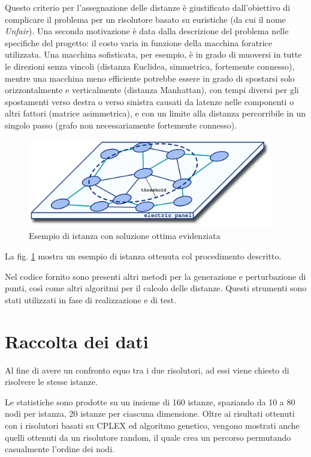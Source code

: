 \documentclass[a4paper, 10pt]{report}
\begin{document}
Questo criterio per l'assegnazione delle distanze è giustificato
dall'obiettivo di complicare il problema per un risolutore basato su
euristiche (da cui il nome \emph{Unfair}). Una seconda motivazione è
data dalla descrizione del problema nelle specifiche del progetto:
il costo varia in funzione della macchina foratrice utilizzata. Una
macchina sofisticata, per esempio, è in grado di muoversi
in tutte le direzioni senza vincoli (distanza Euclidea, simmetrica,
fortemente connesso), mentre una macchina meno efficiente potrebbe
essere in grado di spostarsi solo orizzontalmente e verticalmente
(distanza Manhattan), con tempi diversi per gli spostamenti verso
destra o verso sinistra causati da latenze nelle componenti o altri
fattori (matrice asimmetrica), e con un limite alla distanza percorribile
in un singolo passo (grafo non necessariamente fortemente connesso).

\begin{figure}
  \centering
  \includegraphics[width=0.95\textwidth]{images/fig-generator}
  \caption{Esempio di istanza con soluzione ottima evidenziata}
  \label{fig:generator}
\end{figure}

La fig. \ref{fig:generator} mostra un esempio di istanza ottenuta col
procedimento descritto.

Nel codice fornito sono presenti altri metodi per la generazione e
perturbazione di punti, così come altri algoritmi per il calcolo delle
distanze. Questi strumenti sono stati utilizzati in fase di realizzazione
e di test.



\section{Raccolta dei dati}
\label{sec:analysis_gathering}
Al fine di avere un confronto equo tra i due risolutori, ad essi viene
chiesto di risolvere le stesse istanze.

Le statistiche sono prodotte su un insieme di 160 istanze, spaziando
da 10 a 80 nodi per istanza, 20 istanze per ciascuna dimensione. Oltre
ai risultati ottenuti con i risolutori basati su CPLEX ed algoritmo
genetico, vengono mostrati anche quelli ottenuti da un risolutore random,
il quale crea un percorso permutando casualmente l'ordine dei nodi.
\end{document}
